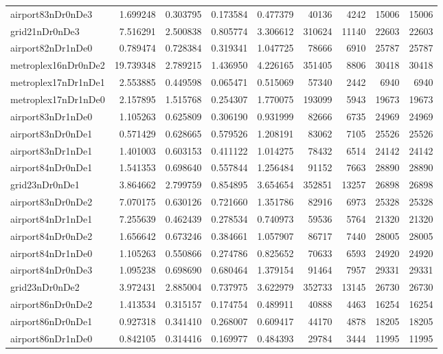 \begin{longtable}{|l|r|r|r|r|r|r|r|r|}
airport83nDr0nDe3 & 1.699248 & 0.303795 & 0.173584 & 0.477379 & 40136 & 4242 & 15006 & 15006 \\
grid21nDr0nDe3 & 7.516291 & 2.500838 & 0.805774 & 3.306612 & 310624 & 11140 & 22603 & 22603 \\
airport82nDr1nDe0 & 0.789474 & 0.728384 & 0.319341 & 1.047725 & 78666 & 6910 & 25787 & 25787 \\
metroplex16nDr0nDe2 & 19.739348 & 2.789215 & 1.436950 & 4.226165 & 351405 & 8806 & 30418 & 30418 \\
metroplex17nDr1nDe1 & 2.553885 & 0.449598 & 0.065471 & 0.515069 & 57340 & 2442 & 6940 & 6940 \\
metroplex17nDr1nDe0 & 2.157895 & 1.515768 & 0.254307 & 1.770075 & 193099 & 5943 & 19673 & 19673 \\
airport83nDr1nDe0 & 1.105263 & 0.625809 & 0.306190 & 0.931999 & 82666 & 6735 & 24969 & 24969 \\
airport83nDr0nDe1 & 0.571429 & 0.628665 & 0.579526 & 1.208191 & 83062 & 7105 & 25526 & 25526 \\
airport83nDr1nDe1 & 1.401003 & 0.603153 & 0.411122 & 1.014275 & 78432 & 6514 & 24142 & 24142 \\
airport84nDr0nDe1 & 1.541353 & 0.698640 & 0.557844 & 1.256484 & 91152 & 7663 & 28890 & 28890 \\
grid23nDr0nDe1 & 3.864662 & 2.799759 & 0.854895 & 3.654654 & 352851 & 13257 & 26898 & 26898 \\
airport83nDr0nDe2 & 7.070175 & 0.630126 & 0.721660 & 1.351786 & 82916 & 6973 & 25328 & 25328 \\
airport84nDr1nDe1 & 7.255639 & 0.462439 & 0.278534 & 0.740973 & 59536 & 5764 & 21320 & 21320 \\
airport84nDr0nDe2 & 1.656642 & 0.673246 & 0.384661 & 1.057907 & 86717 & 7440 & 28005 & 28005 \\
airport84nDr1nDe0 & 1.105263 & 0.550866 & 0.274786 & 0.825652 & 70633 & 6593 & 24920 & 24920 \\
airport84nDr0nDe3 & 1.095238 & 0.698690 & 0.680464 & 1.379154 & 91464 & 7957 & 29331 & 29331 \\
grid23nDr0nDe2 & 3.972431 & 2.885004 & 0.737975 & 3.622979 & 352733 & 13145 & 26730 & 26730 \\
airport86nDr0nDe2 & 1.413534 & 0.315157 & 0.174754 & 0.489911 & 40888 & 4463 & 16254 & 16254 \\
airport86nDr0nDe1 & 0.927318 & 0.341410 & 0.268007 & 0.609417 & 44170 & 4878 & 18205 & 18205 \\
airport86nDr1nDe0 & 0.842105 & 0.314416 & 0.169977 & 0.484393 & 29784 & 3444 & 11995 & 11995 \\

\end{longtable}
